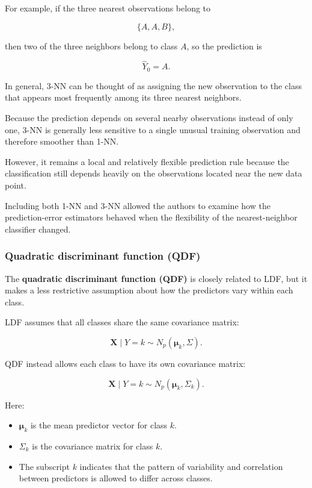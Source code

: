 \documentclass[
  letterpaper,
  DIV=11,
  numbers=noendperiod]{scrreprt}
\providecommand{\tightlist}{%
  \setlength{\itemsep}{0pt}\setlength{\parskip}{0pt}}
\begin{document}
For example, if the three nearest observations belong to

\[
\{A,A,B\},
\]

then two of the three neighbors belong to class \(A\), so the prediction
is

\[
\widehat{Y}_0=A.
\]

In general, 3-NN can be thought of as assigning the new observation to
the class that appears most frequently among its three nearest
neighbors.

Because the prediction depends on several nearby observations instead of
only one, 3-NN is generally less sensitive to a single unusual training
observation and therefore smoother than 1-NN.

However, it remains a local and relatively flexible prediction rule
because the classification still depends heavily on the observations
located near the new data point.

Including both 1-NN and 3-NN allowed the authors to examine how the
prediction-error estimators behaved when the flexibility of the
nearest-neighbor classifier changed.

\subsubsection{Quadratic discriminant function
(QDF)}\label{quadratic-discriminant-function-qdf}

The \textbf{quadratic discriminant function (QDF)} is closely related to
LDF, but it makes a less restrictive assumption about how the predictors
vary within each class.

LDF assumes that all classes share the same covariance matrix:

\[
\mathbf{X}\mid Y=k
\sim
N_p(\boldsymbol{\mu}_k,\Sigma).
\]

QDF instead allows each class to have its own covariance matrix:

\[
\mathbf{X}\mid Y=k
\sim
N_p(\boldsymbol{\mu}_k,\Sigma_k).
\]

Here:

\begin{itemize}
\tightlist
\item
  \(\boldsymbol{\mu}_k\) is the mean predictor vector for class \(k\).
\item
  \(\Sigma_k\) is the covariance matrix for class \(k\).
\item
  The subscript \(k\) indicates that the pattern of variability and
  correlation between predictors is allowed to differ across classes.
\end{itemize}
\end{document}
